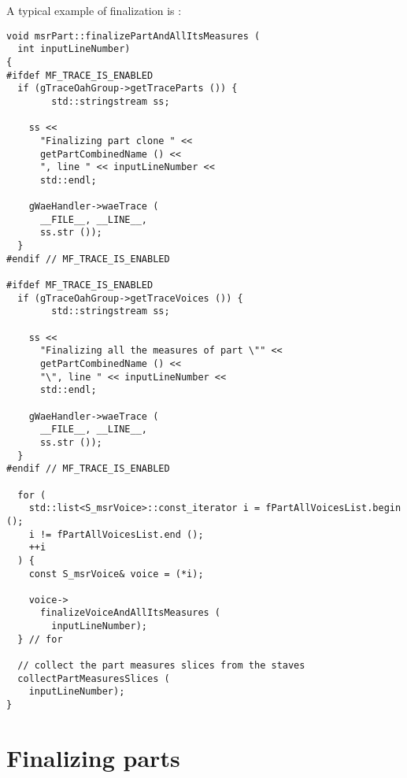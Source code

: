A typical example of \cascading finalization is :
\begin{lstlisting}[language=CPlusPlus]
void msrPart::finalizePartAndAllItsMeasures (
  int inputLineNumber)
{
#ifdef MF_TRACE_IS_ENABLED
  if (gTraceOahGroup->getTraceParts ()) {
		std::stringstream ss;

    ss <<
      "Finalizing part clone " <<
      getPartCombinedName () <<
      ", line " << inputLineNumber <<
      std::endl;

    gWaeHandler->waeTrace (
      __FILE__, __LINE__,
      ss.str ());
  }
#endif // MF_TRACE_IS_ENABLED

#ifdef MF_TRACE_IS_ENABLED
  if (gTraceOahGroup->getTraceVoices ()) {
		std::stringstream ss;

    ss <<
      "Finalizing all the measures of part \"" <<
      getPartCombinedName () <<
      "\", line " << inputLineNumber <<
      std::endl;

    gWaeHandler->waeTrace (
      __FILE__, __LINE__,
      ss.str ());
  }
#endif // MF_TRACE_IS_ENABLED

  for (
    std::list<S_msrVoice>::const_iterator i = fPartAllVoicesList.begin ();
    i != fPartAllVoicesList.end ();
    ++i
  ) {
    const S_msrVoice& voice = (*i);

    voice->
      finalizeVoiceAndAllItsMeasures (
        inputLineNumber);
  } // for

  // collect the part measures slices from the staves
  collectPartMeasuresSlices (
    inputLineNumber);
}
\end{lstlisting}


\section{Finalizing parts}

